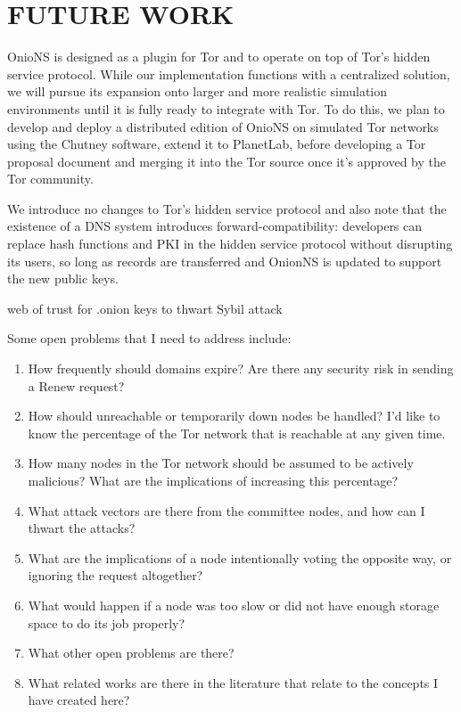 
\chapter{FUTURE WORK}


OnioNS is designed as a plugin for Tor and to operate on top of Tor's hidden service protocol. While our implementation functions with a centralized solution, we will pursue its expansion onto larger and more realistic simulation environments until it is fully ready to integrate with Tor. To do this, we plan to develop and deploy a distributed edition of OnioNS on simulated Tor networks using the Chutney software, extend it to PlanetLab, before developing a Tor proposal document and merging it into the Tor source once it's approved by the Tor community.

We introduce no changes to Tor's hidden service protocol and also note that the existence of a DNS system introduces forward-compatibility: developers can replace hash functions and PKI in the hidden service protocol without disrupting its users, so long as records are transferred and OnionNS is updated to support the new public keys.

web of trust for .onion keys to thwart Sybil attack

Some open problems that I need to address include:

\begin{enumerate}
	\item How frequently should domains expire? Are there any security risk in sending a Renew request?
	\item How should unreachable or temporarily down nodes be handled? I'd like to know the percentage of the Tor network that is reachable at any given time.
	\item How many nodes in the Tor network should be assumed to be actively malicious? What are the implications of increasing this percentage?
	\item What attack vectors are there from the committee nodes, and how can I thwart the attacks?
	\item What are the implications of a node intentionally voting the opposite way, or ignoring the request altogether?
	\item What would happen if a node was too slow or did not have enough storage space to do its job properly?
	\item What other open problems are there?
	\item What related works are there in the literature that relate to the concepts I have created here?
\end{enumerate}